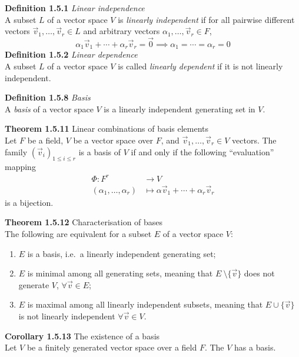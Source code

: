 \documentclass[8pt,landscape]{article}
\begin{document}
\begin{multicols}{3}
    \textbf{Definition 1.5.1} \emph{Linear independence} \\
    A subset $L$ of a vector space $V$ is \emph{linearly independent}
    if for all pairwise different vectors
    $\vec{v}_1, \ldots, \vec{v}_r \in L$ and arbitrary vectors
    $\alpha_1, \ldots, \vec{v}_r \in F$,
    \[
        \alpha_1 \vec{v}_1 + \cdots + \alpha_r \vec{v}_r = \vec{0} \implies
        \alpha_1 = \cdots = \alpha_r = 0
    \]
    \textbf{Definition 1.5.2} \emph{Linear dependence} \\
    A subset $L$ of a vector space $V$ is called \emph{linearly dependent} if it is not
    linearly independent.

    \textbf{Definition 1.5.8} \emph{Basis} \\
    A \emph{basis} of a vector space $V$ is a linearly independent generating set in
    $V$.

    \textbf{Theorem 1.5.11} Linear combinations of basis elements \\
    Let $F$ be a field, $V$ be a vector space over $F$, and
    $\vec{v}_1, \ldots, \vec{v}_r \in V$ vectors.
    The family ${(\vec{v}_i)}_{1 \leq i \leq r}$ is a basis of $V$ if and only if the
    following ``evaluation'' mapping
    \begin{align*}{}
        \Phi : F^r                    & \to V \\
        (\alpha_1, \ldots, \alpha_r)  & \mapsto \alpha\vec{v}_1 +
        \cdots + \alpha_r\vec{v}_r
    \end{align*}
    is a bijection.

    \textbf{Theorem 1.5.12} Characterisation of bases \\
    The following are equivalent for a subset $E$ of a vector space $V$:
    \begin{enumerate}
        \item $E$ is a basis, i.e.\ a linearly independent generating set;
        \item $E$ is minimal among all generating sets,
            meaning that $E \ \setminus \{\vec{v}\}$ does not generate $V$,
            $\forall \vec{v} \in E$;
        \item $E$ is maximal among all linearly independent subsets,
            meaning that $E \cup \{\vec{v}\}$ is not linearly independent
            $\forall \vec{v} \in V$.
    \end{enumerate}

    \textbf{Corollary 1.5.13} The existence of a basis \\
    Let $V$ be a finitely generated vector space over a field $F$.  The $V$ has a basis.


\end{multicols}
\end{document}
